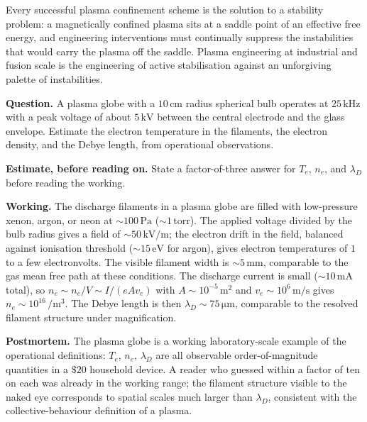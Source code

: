 \begin{principle}
Every successful plasma confinement scheme is the solution to a
stability problem: a magnetically confined plasma sits at a saddle
point of an effective free energy, and engineering interventions
must continually suppress the instabilities that would carry the
plasma off the saddle. Plasma engineering at industrial and fusion
scale is the engineering of active stabilisation against an
unforgiving palette of instabilities.
\end{principle}

\begin{estimation}
\textbf{Question.} A plasma globe with a $10\,\si{\centi\meter}$
radius spherical bulb operates at $25\,\si{\kilo\hertz}$ with a peak
voltage of about $5\,\si{\kilo\volt}$ between the central electrode
and the glass envelope. Estimate the electron temperature in the
filaments, the electron density, and the Debye length, from
operational observations.

\textbf{Estimate, before reading on.} State a factor-of-three answer
for $T_{e}$, $n_{e}$, and $\lambda_{D}$ before reading the working.

\textbf{Working.} The discharge filaments in a plasma globe are
filled with low-pressure xenon, argon, or neon at $\sim 100\,\si{
\pascal}$ ($\sim 1\,\text{torr}$). The applied voltage divided by
the bulb radius gives a field of $\sim 50\,\si{\kilo\volt\per\meter}$;
the electron drift in the field, balanced against ionisation
threshold ($\sim 15\,\si{\electronvolt}$ for argon), gives electron
temperatures of $1$ to a few electronvolts. The visible filament
width is $\sim 5\,\si{\milli\meter}$, comparable to the gas mean
free path at these conditions. The discharge current is small
($\sim 10\,\si{\milli\ampere}$ total), so $n_{e}\sim n_{e}/V \sim
I/(eAv_{e})$ with $A\sim 10^{-5}\,\si{\meter\squared}$ and
$v_{e}\sim 10^{6}\,\si{\meter\per\second}$ gives $n_{e}\sim
10^{16}\,\si{\per\meter\cubed}$. The Debye length is then
$\lambda_{D}\sim 75\,\si{\micro\meter}$, comparable to the resolved
filament structure under magnification.

\textbf{Postmortem.} The plasma globe is a working
laboratory-scale example of the operational definitions: $T_{e}$,
$n_{e}$, $\lambda_{D}$ are all observable order-of-magnitude
quantities in a $\$20$ household device. A reader who guessed within
a factor of ten on each was already in the working range; the
filament structure visible to the naked eye corresponds to spatial
scales much larger than $\lambda_{D}$, consistent with the
collective-behaviour definition of a plasma.
\end{estimation}

